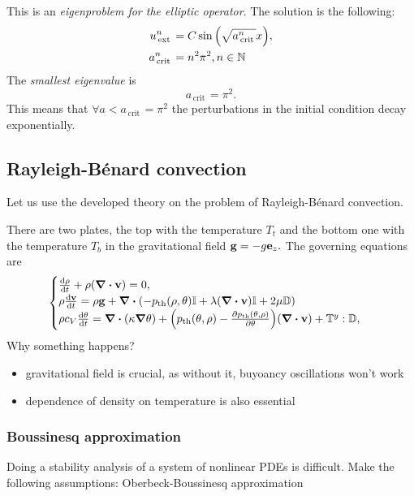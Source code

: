\documentclass[reqno, a4paper]{article}
\begin{document}
	This is an \textit{eigenproblem for the elliptic operator}. The solution is the following:
	\begin{align*}
		u_{\, \text{ext} \,}^n &= C \sin\qty(\sqrt{a_{\, \text{crit} \,}^n}x), \\
		a^n_{\, \text{crit} \,} &= n^{2}\pi^{2}, n \in \N
	\end{align*}
The \textit{smallest eigenvalue} is
\[
	a_{\, \text{crit} \,} = \pi^{2}.
\]
This means that $\forall a < a_{\, \text{crit} \,} = \pi^{2}$ the perturbations in the initial condition decay exponentially.

\subsection{Rayleigh-Bénard convection}
\label{sec:convection}
Let us use the developed theory on the problem of Rayleigh-Bénard convection. 
\begin{tikzpicture}
\end{tikzpicture}
There are two plates, the top with the temperature $T_t$ and the bottom one with the temperature $T_b$ in the gravitational field $\vb{g}= - g \vb{e}_z.$ The governing equations are
\[
	\begin{cases}
		\dv{\rho}{t} + \rho \qty(\divergence{\vb{v}}) = 0, \\
		\rho \dv{\vb{v}}{t} = \rho \vb{g} + \divergence{\qty(-\pth\qty(\rho, \theta)\identity + \lambda \qty(\divergence{\vb{v}})\identity + 2 \mu \symvgrad)} \\
		\rho c_{V}\dv{\theta}{t} = \divergence{\qty(\kappa \grad \theta)}+\qty(\pth\qty(\theta, \rho)-\pdv{\pth\qty(\theta, \rho)}{\theta})\qty(\divergence{\vb{v}}) + \cstress : \symvgrad,
	\end{cases}
\]
Why something happens?
\begin{itemize}
	\item gravitational field is crucial, as without it, buyoancy oscillations won't work
	\item dependence of density on temperature is also essential
\end{itemize}

\subsubsection{Boussinesq approximation}
\label{sec:boussinesq_approximation}
Doing a stability analysis of a system of nonlinear PDEs is difficult. Make the following assumptions: Oberbeck-Boussinesq approximation
\end{document}
